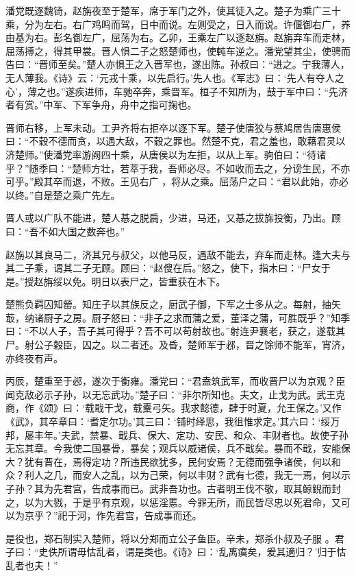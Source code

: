 \documentclass[a4paper,12pt,UTF8,twoside]{ctexbook}
\begin{document}
潘党既逐魏锜，赵旃夜至于楚军，席于军门之外，使其徒入之。楚子为乘广三十乘，分为左右。右广鸡鸣而驾，日中而说。左则受之，日入而说。许偃御右广，养由基为右。彭名御左广，屈荡为右。乙卯，王乘左广以逐赵旃。赵旃弃车而走林，屈荡搏之，得其甲裳。晋人惧二子之怒楚师也，使軘车逆之。潘党望其尘，使骋而告曰：“晋师至矣。”楚人亦惧王之入晋军也，遂出陈。孙叔曰：“进之。宁我薄人，无人薄我。《诗》云：‘元戎十乘，以先启行。’先人也。《军志》曰：‘先人有夺人之心’，薄之也。”遂疾进师，车驰卒奔，乘晋军。桓子不知所为，鼓于军中曰：“先济者有赏。”中军、下军争舟，舟中之指可掬也。

晋师右移，上军未动。工尹齐将右拒卒以逐下军。楚子使唐狡与蔡鸠居告唐惠侯曰：“不穀不德而贪，以遇大敌，不穀之罪也。然楚不克，君之羞也，敢藉君灵以济楚师。”使潘党率游阙四十乘，从唐侯以为左拒，以从上军。驹伯曰：“待诸乎？”随季曰：“楚师方壮，若萃于我，吾师必尽。不如收而去之，分谤生民，不亦可乎。”殿其卒而退，不败。王见右广 ，将从之乘。屈荡户之曰：“君以此始，亦必以终。”自是楚之乘广先左。

晋人或以广队不能进，楚人惎之脱扃，少进，马还，又惎之拔旆投衡，乃出。顾曰：“吾不如大国之数奔也。”

赵旃以其良马二，济其兄与叔父，以他马反，遇敌不能去，弃车而走林。逢大夫与其二子乘，谓其二子无顾。顾曰：“赵傁在后。”怒之，使下，指木曰：“尸女于是。”授赵旃绥以免。明日以表尸之，皆重获在木下。

楚熊负羁囚知罃。知庄子以其族反之，厨武子御，下军之士多从之。每射，抽矢菆，纳诸厨子之房。厨子怒曰：“非子之求而蒲之爱，董泽之蒲，可胜既乎？”知季曰：“不以人子，吾子其可得乎？吾不可以苟射故也。”射连尹襄老，获之，遂载其尸。射公子穀臣，囚之。以二者还。及昏，楚师军于邲，晋之馀师不能军，宵济，亦终夜有声。

丙辰，楚重至于邲，遂次于衡雍。潘党曰：“君盍筑武军，而收晋尸以为京观？臣闻克敌必示子孙，以无忘武功。”楚子曰：“非尔所知也。夫文，止戈为武。武王克商，作《颂》曰：‘载戢干戈，载櫜弓矢。我求懿德，肆于时夏，允王保之。’又作《武》，其卒章曰：‘耆定尔功。’其三曰：‘铺时绎思，我徂惟求定。’其六曰：‘绥万邦，屡丰年。’夫武，禁暴、戢兵、保大、定功、安民、和众、丰财者也。故使子孙无忘其章。今我使二国暴骨，暴矣；观兵以威诸侯，兵不戢矣。暴而不戢，安能保大？犹有晋在，焉得定功？所违民欲犹多，民何安焉？无德而强争诸侯，何以和众？利人之几，而安人之乱，以为己荣，何以丰财？武有七德，我无一焉，何以示子孙？其为先君宫，告成事而已。武非吾功也。古者明王伐不敬，取其鲸鲵而封之，以为大戮，于是乎有京观，以惩淫慝。今罪无所，而民皆尽忠以死君命，又可以为京乎？”祀于河，作先君宫，告成事而还。

是役也，郑石制实入楚师，将以分郑而立公子鱼臣。辛未，郑杀仆叔及子服 。君子曰：“史佚所谓毋怙乱者，谓是类也。《诗》曰：‘乱离瘼矣，爰其適归？’归于怙乱者也夫！”
\end{document}
